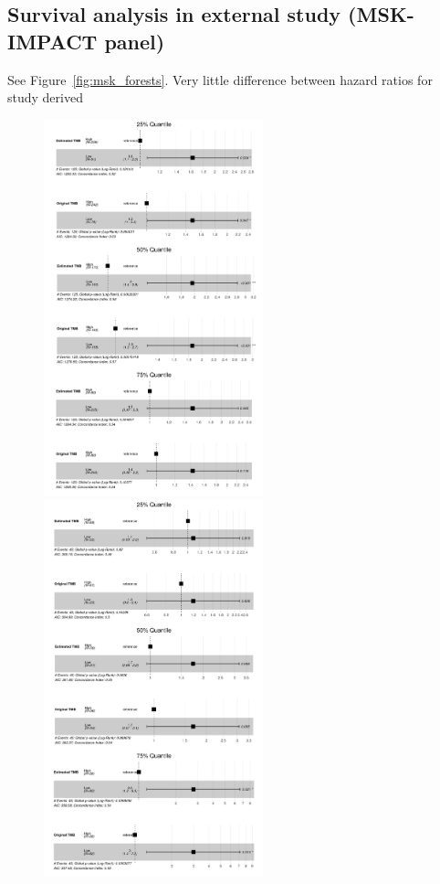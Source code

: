 \documentclass[12pt]{article}
\begin{document}
\subsection{Survival analysis in external study (MSK-IMPACT panel)}
See Figure~\ref{fig:msk_forests}. Very little difference between hazard ratios for study derived

\begin{figure}[h]
    \centering
    \includegraphics[width=2.5in]{results/figures/skcm_forests.png}
    \includegraphics[width=2.5in]{results/figures/coadread_forests.png}

\end{figure}
\end{document}

